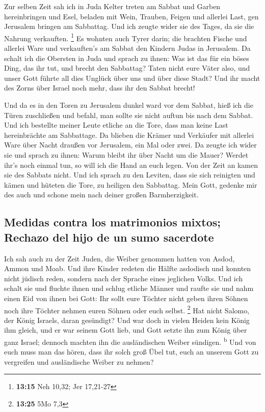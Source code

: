  Zur selben Zeit sah ich in Juda Kelter treten am Sabbat
und Garben hereinbringen und Esel, beladen mit Wein, Trauben, Feigen und
allerlei Last, gen Jerusalem bringen am Sabbattag. Und ich zeugte wider
sie des Tages, da sie die Nahrung verkauften. \footnote{\textbf{13:15}
  Neh 10,32; Jer 17,21-27}  Es wohnten auch Tyrer darin;
die brachten Fische und allerlei Ware und verkauften's am Sabbat den
Kindern Judas in Jerusalem.  Da schalt ich die Obersten
in Juda und sprach zu ihnen: Was ist das für ein böses Ding, das ihr
tut, und brecht den Sabbattag?  Taten nicht eure Väter
also, und unser Gott führte all dies Unglück über uns und über diese
Stadt? Und ihr macht des Zorns über Israel noch mehr, dass ihr den
Sabbat brecht!

 Und da es in den Toren zu Jerusalem dunkel ward vor dem
Sabbat, hieß ich die Türen zuschließen und befahl, man sollte sie nicht
auftun bis nach dem Sabbat. Und ich bestellte meiner Leute etliche an
die Tore, dass man keine Last hereinbrächte am Sabbattage.
 Da blieben die Krämer und Verkäufer mit allerlei Ware
über Nacht draußen vor Jerusalem, ein Mal oder zwei.  Da
zeugte ich wider sie und sprach zu ihnen: Warum bleibt ihr über Nacht um
die Mauer? Werdet ihr's noch einmal tun, so will ich die Hand an euch
legen. Von der Zeit an kamen sie des Sabbats nicht.  Und
ich sprach zu den Leviten, dass sie sich reinigten und kämen und hüteten
die Tore, zu heiligen den Sabbattag. Mein Gott, gedenke mir des auch und
schone mein nach deiner großen Barmherzigkeit.

\hypertarget{medidas-contra-los-matrimonios-mixtos-rechazo-del-hijo-de-un-sumo-sacerdote}{%
\subsection{Medidas contra los matrimonios mixtos; Rechazo del hijo de
un sumo
sacerdote}\label{medidas-contra-los-matrimonios-mixtos-rechazo-del-hijo-de-un-sumo-sacerdote}}

 Ich sah auch zu der Zeit Juden, die Weiber genommen
hatten von Asdod, Ammon und Moab.  Und ihre Kinder
redeten die Hälfte asdodisch und konnten nicht jüdisch reden, sondern
nach der Sprache eines jeglichen Volks.  Und ich schalt
sie und fluchte ihnen und schlug etliche Männer und raufte sie und nahm
einen Eid von ihnen bei Gott: Ihr sollt eure Töchter nicht geben ihren
Söhnen noch ihre Töchter nehmen euren Söhnen oder euch selbst.
\footnote{\textbf{13:25} 5Mo 7,3}  Hat nicht Salomo, der
König Israels, daran gesündigt? Und war doch in vielen Heiden kein König
ihm gleich, und er war seinem Gott lieb, und Gott setzte ihn zum König
über ganz Israel; dennoch machten ihn die ausländischen Weiber sündigen.
\textsuperscript{b}  Und von euch muss man das hören,
dass ihr solch groß Übel tut, euch an unserem Gott zu vergreifen und
ausländische Weiber zu nehmen?

